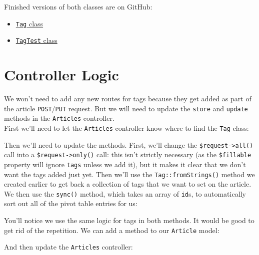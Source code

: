 Finished versions of both classes are on GitHub:

\begin{itemize}
    \item \href{https://github.com/develop-me/bootcamp--laravel-project/blob/develop/app/Tag.php}{\texttt{Tag} class}
    \item \href{https://github.com/develop-me/bootcamp--laravel-project/blob/develop/tests/Unit/TagTest.php}{\texttt{TagTest} class}
\end{itemize}


\section{Controller Logic}

We won't need to add any new routes for tags because they get added as part of the article \texttt{POST}/\texttt{PUT} request. But we will need to update the \texttt{store} and \texttt{update} methods in the \texttt{Articles} controller.
\\

First we'll need to let the \texttt{Articles} controller know where to find the \texttt{Tag} class:


Then we'll need to update the methods. First, we'll change the \texttt{\$request->all()} call into a \texttt{\$request->only()} call: this isn't strictly necessary (as the \texttt{\$fillable} property will ignore \texttt{tags} unless we add it), but it makes it clear that we don't want the tags added just yet. Then we'll use the \texttt{Tag::fromStrings()} method we created earlier to get back a collection of tags that we want to set on the article. We then use the \texttt{sync()} method, which takes an array of \texttt{id}s, to automatically sort out all of the pivot table entries for us:


You'll notice we use the same logic for tags in both methods. It would be good to get rid of the repetition. We can add a method to our \texttt{Article} model:


And then update the \texttt{Articles} controller:



